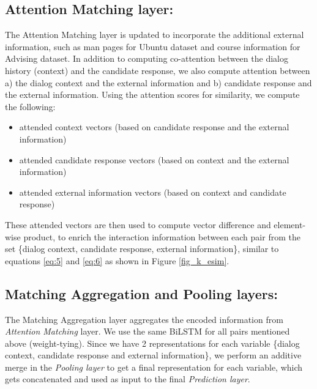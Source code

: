 \documentclass[letterpaper]{article} %
\begin{document}
\subsection{Attention Matching layer:}
The Attention Matching layer is updated to incorporate the additional external information, such as man pages for Ubuntu dataset and course information for Advising dataset. In addition to computing co-attention between the dialog history (context) and the candidate response, we also compute attention between a) the dialog context and the external information and b) candidate response and the external information. Using the attention scores for similarity, we compute the following:
\begin{itemize}
    \item attended context vectors (based on candidate response and the external information) 
    \item attended candidate response vectors (based on context and the external information) 
    \item attended external information vectors (based on context and candidate response)
\end{itemize}
These attended vectors are then used to compute vector difference and element-wise product, to enrich the interaction information between each pair from the set \{dialog context, candidate response, external information\}, similar to equations \ref{eq:5} and \ref{eq:6} as shown in Figure \ref{fig_k_esim}.

\subsection{Matching Aggregation and Pooling layers:}
The Matching Aggregation layer aggregates the encoded information from \textit{Attention Matching} layer. We use the same BiLSTM for all pairs mentioned above (weight-tying). Since we have 2 representations for each variable \{dialog context, candidate response and external information\}, we perform an additive merge in the \textit{Pooling layer} to get a final representation for each variable, which gets concatenated and used as input to the final \textit{Prediction layer}.
\end{document}
